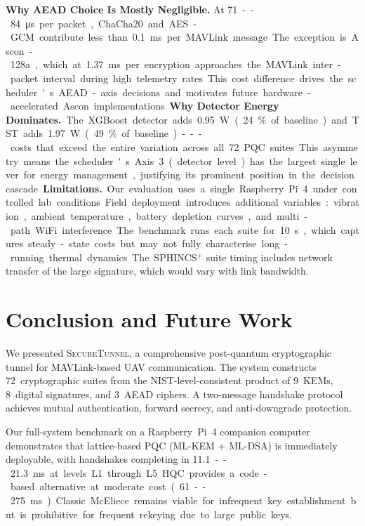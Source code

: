 \documentclass[conference]{IEEEtran}
\newcommand{\sys}{\textsc{SecureTunnel}}
\begin{document}
\textbf{Why AEAD Choice Is Mostly Negligible.}
At \SI{71}--\SI{84}{\micro\second} per packet, ChaCha20 and AES-GCM contribute less than \SI{0.1}{\milli\second} per MAVLink message.
The exception is Ascon-128a, which at \SI{1.37}{\milli\second} per encryption approaches the MAVLink inter-packet interval during high telemetry rates.
This cost difference drives the scheduler's AEAD-axis decisions and motivates future hardware-accelerated Ascon implementations.

\textbf{Why Detector Energy Dominates.}
The XGBoost detector adds \SI{0.95}{\watt} (24\% of baseline) and TST adds \SI{1.97}{\watt} (49\% of baseline)---costs that exceed the entire variation across all 72 PQC suites.
This asymmetry means the scheduler's Axis~3 (detector level) has the largest single lever for energy management, justifying its prominent position in the decision cascade.

\textbf{Limitations.}
Our evaluation uses a single Raspberry Pi~4 under controlled lab conditions.
Field deployment introduces additional variables: vibration, ambient temperature, battery depletion curves, and multi-path WiFi interference.
The benchmark runs each suite for \SI{10}{\second}, which captures steady-state costs but may not fully characterise long-running thermal dynamics.
The SPHINCS$^+$ suite timing includes network transfer of the large signature, which would vary with link bandwidth.

\section{Conclusion and Future Work}
\label{sec:conclusion}

We presented \sys{}, a comprehensive post-quantum cryptographic tunnel for MAVLink-based UAV communication.
The system constructs 72~cryptographic suites from the NIST-level-consistent product of 9~KEMs, 8~digital signatures, and 3~AEAD ciphers.
A two-message handshake protocol achieves mutual authentication, forward secrecy, and anti-downgrade protection.

Our full-system benchmark on a Raspberry~Pi~4 companion computer demonstrates that lattice-based PQC (ML-KEM + ML-DSA) is immediately deployable, with handshakes completing in \SI{11.1}--\SI{21.3}{\milli\second} at levels L1 through L5.
HQC provides a code-based alternative at moderate cost (\SI{61}--\SI{275}{\milli\second}).
Classic McEliece remains viable for infrequent key establishment but is prohibitive for frequent rekeying due to large public keys.
\end{document}

